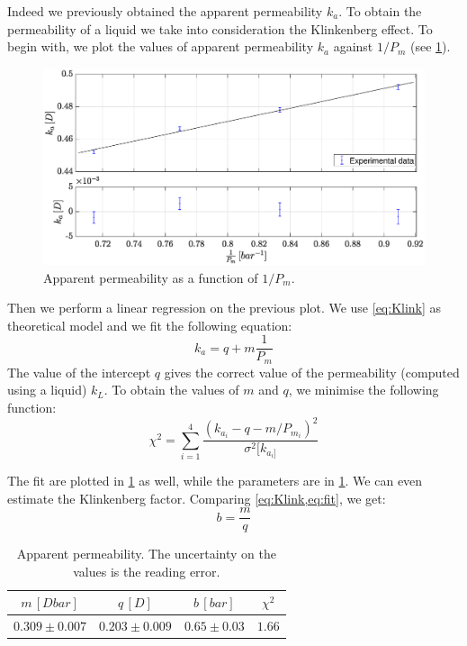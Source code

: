 \documentclass[10pt, a4paper]{amsart}
\begin{document}
Indeed we previously obtained the apparent permeability $k_a$. To obtain the permeability of a liquid we take into consideration the Klinkenberg effect. To begin with, we plot the values of apparent permeability $k_a$ against $1/P_m$ (see \cref{fig:Fit_Core2}).
\begin{figure}[H]
    \centering
    \includegraphics[width=\textwidth]{Fit_Core2.eps}
    \caption{Apparent permeability as a function of $1/P_m$.}
    \label{fig:Fit_Core2}
\end{figure}
Then we perform a linear regression on the previous plot. We use \cref{eq:Klink} as theoretical model and we fit the following equation:
\begin{equation}
\label{eq:fit}
    k_a = q + m \frac{1}{P_m}
\end{equation}
The value of the intercept $q$ gives the correct value of the permeability (computed using a liquid) $k_L$. 
To obtain the values of $m$ and $q$, we minimise the following function:
\begin{equation}
    \chi^2 = \sum_{i=1}^4 \frac{\left(k_{a_i} - q - m / P_{m_i} \right)^2}{\sigma^2[k_{a_i]}}
\end{equation}

The fit are plotted in \cref{fig:Fit_Core2} as well, while the parameters are in \cref{tab:Fit}. We can even estimate the Klinkenberg factor. Comparing \cref{eq:Klink,eq:fit}, we get:
\begin{equation}
    b = \frac{m}{q}
\end{equation}
\begin{table}[H]
    \centering
    \begin{tabular}{cccc}
    \toprule
       $m \, [D bar]$ & $q \, [D]$ & $b \, [bar]$ & $\chi^2$\\
    \midrule
       $0.309 \pm 0.007$ & $0.203 \pm 0.009$ & $0.65 \pm 0.03$ & $1.66$\\
    \bottomrule
    \end{tabular}
    \caption{Apparent permeability. The uncertainty on the values is the reading error.}
    \label{tab:Fit}
\end{table}
\end{document}

